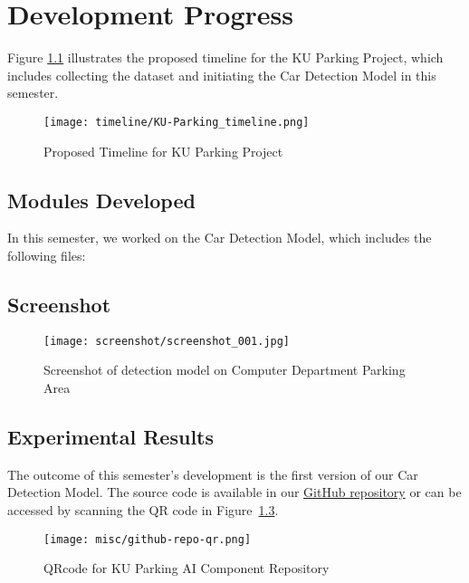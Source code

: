 \chapter{Development Progress}
\label{chap:developmentprogress}
Figure \ref{fig:timeline-dev-progress} illustrates the proposed timeline for the KU Parking Project, which includes collecting the dataset and initiating the Car Detection Model in this semester.

\begin{figure}[H]
    \centering
    \texttt{[image: timeline/KU-Parking\_timeline.png]}
    \caption{Proposed Timeline for KU Parking Project}
    \label{fig:timeline-dev-progress}
\end{figure}

\section{Modules Developed}
\label{section:module-developed}
In this semester, we worked on the Car Detection Model, which includes the following files:

\section{Screenshot}
\label{section:screenshot}
\begin{figure}[H]
    \centering
    \texttt{[image: screenshot/screenshot\_001.jpg]}
    \caption{Screenshot of detection model on Computer Department Parking Area}
    \label{fig:screenshot001}
\end{figure}


\section{Experimental Results}
\label{section:experimental-results}
The outcome of this semester’s development is the first version of our Car Detection Model. The source code is available in our \href{https://github.com/ReggieReo/ku-parking-ai-component}{GitHub repository} or can be accessed by scanning the QR code in Figure~\ref{fig:github-repo-ai-component-qr}.
\begin{figure}[H]
    \centering
    \texttt{[image: misc/github-repo-qr.png]}
    \caption{QRcode for KU Parking AI Component Repository}
    \label{fig:github-repo-ai-component-qr}
\end{figure}

